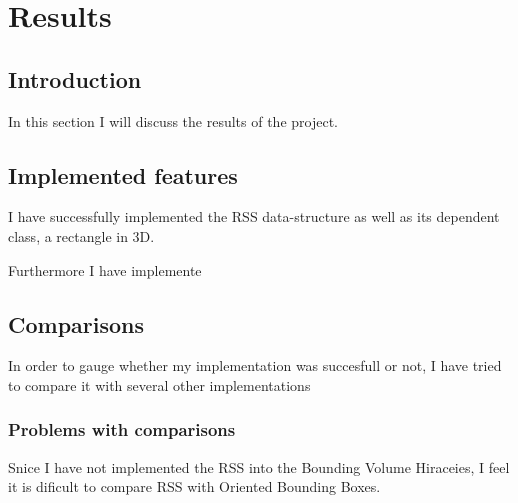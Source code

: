 
\section{Results}
\label{results}
\subsection{Introduction}
In this section I will discuss the results of the project.

\subsection{Implemented features}
I have successfully implemented the RSS data-structure as well as its dependent class, a rectangle in 3D. 

Furthermore I have implemente

\subsection{Comparisons}

In order to gauge whether my implementation was succesfull or not, I have tried to compare it with several other implementations  

\subsubsection{Problems with comparisons}
Snice I have not implemented the RSS into the Bounding Volume Hiraceies, I feel it is dificult to compare RSS with Oriented Bounding Boxes.
